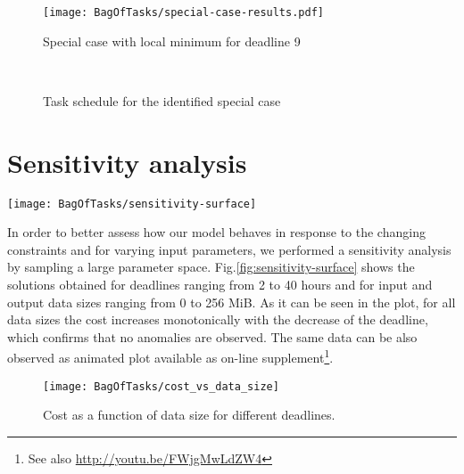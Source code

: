 {  \begin{figure}[tb]
     \centering \texttt{[image: BagOfTasks/special-case-results.pdf]}
     \caption{Special case with local minimum for deadline 9
     \label{fig:special-case-results}}
  \end{figure}

  \begin{figure}[tb]
     \centering 
      \\
     \caption{Task schedule for the identified special case}
  \end{figure}
    
\section{Sensitivity analysis}
\label{sec:bot:sensitivity}
    
  \begin{figure*}[tb]
     \centering \texttt{[image: BagOfTasks/sensitivity-surface]}
     \caption{Optimal cost for a wide range of deadline constraints and data
     sizes.\label{fig:sensitivity-surface}}
  \end{figure*} 
  
  In order to better assess how our model behaves in response to the changing
  constraints and for varying input parameters, we performed a sensitivity
  analysis by sampling a large parameter space.
  Fig.\ref{fig:sensitivity-surface} shows the solutions obtained for deadlines
  ranging from 2 to 40 hours and for input and output data sizes ranging from
  0 to 256 MiB. As it can be seen in the plot, for all data sizes the cost
  increases monotonically with the decrease of the deadline, which confirms
  that no anomalies are observed. The same data can be also observed as
  animated plot available as on-line supplement\footnote{See also
  \url{http://youtu.be/FWjgMwLdZW4}}.
  
  \begin{figure}[tb]
     \centering \texttt{[image: BagOfTasks/cost\_vs\_data\_size]}
     \caption{Cost as a function of data size for different
     deadlines.\label{fig:cost_vs_data_size}}
  \end{figure} 
  
}
